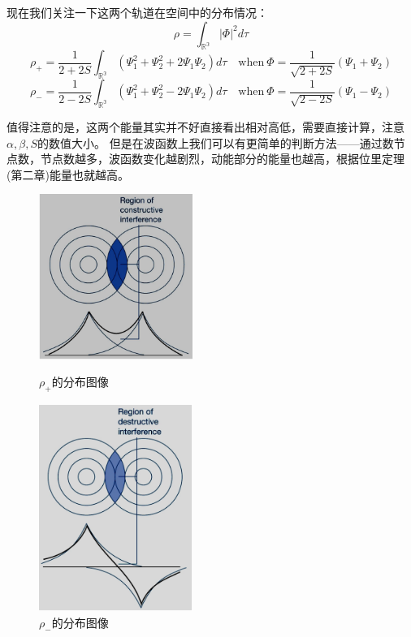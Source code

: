 现在我们关注一下这两个轨道在空间中的分布情况：
\[\rho=\int_{\mathbb{R^3}}|\varPhi|^2d\tau\]
\[\rho_+=\frac{1}{2+2S}\int_{\mathbb{R^3}}\left(\varPsi_1^2+\varPsi_2^2+2\varPsi_1\varPsi_2\right) d\tau\quad \text{when} \ \varPhi=\frac{1}{\sqrt{2+2S}}(\varPsi_1+\varPsi_2)\] 
\[\rho_-=\frac{1}{2-2S}\int_{\mathbb{R^3}}\left(\varPsi_1^2+\varPsi_2^2-2\varPsi_1\varPsi_2\right) d\tau\quad \text{when} \ \varPhi=\frac{1}{\sqrt{2-2S}}(\varPsi_1-\varPsi_2)\]

值得注意的是，这两个能量其实并不好直接看出相对高低，需要直接计算，注意$\alpha,\beta,S$的数值大小。
但是在波函数上我们可以有更简单的判断方法——通过数节点数，节点数越多，波函数变化越剧烈，动能部分的能量也越高，根据位里定理(第二章)能量也就越高。

\begin{figure}[htbp]
    \centering
    \begin{minipage}[t]{0.48\textwidth}
    \centering
    \includegraphics[width=5cm]{fig/lzhx/微信图片_20211102112346.png}
    \caption{$\rho_+$的分布图像}
    \end{minipage}
    \begin{minipage}[t]{0.48\textwidth}
    \centering
    \includegraphics[width=5cm]{fig/lzhx/微信图片_202111021123461.png}
    \caption{$\rho_-$的分布图像}
    \end{minipage}
\end{figure}

